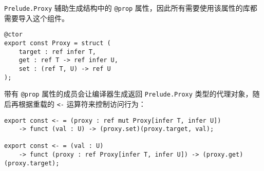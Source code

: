 \lstinline!Prelude.Proxy! 辅助生成结构中的 \lstinline!@prop! 属性，因此所有需要使用该属性的库都需要导入这个组件。

\begin{lstlisting}
@ctor
export const Proxy = struct (
    target : ref infer T,
    get : ref T -> ref infer U,
    set : (ref T, U) -> ref U
);
\end{lstlisting}

带有 \lstinline!@prop! 属性的成员会让编译器生成返回 \lstinline!Prelude.Proxy! 类型的代理对象，随后再根据重载的 \lstinline!<-! 运算符来控制访问行为：

\begin{lstlisting}
export const <- = (proxy : ref mut Proxy[infer T, infer U]) 
    -> funct (val : U) -> (proxy.set)(proxy.target, val);

export const <- = (val : U) 
    -> funct (proxy : ref Proxy[infer T, infer U]) -> (proxy.get)(proxy.target);
\end{lstlisting}